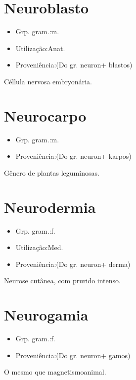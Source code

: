 \section{Neuroblasto}
\begin{itemize}
\item {Grp. gram.:m.}
\end{itemize}
\begin{itemize}
\item {Utilização:Anat.}
\end{itemize}
\begin{itemize}
\item {Proveniência:(Do gr. \textunderscore neuron\textunderscore  + \textunderscore blastos\textunderscore )}
\end{itemize}
Céllula nervosa embryonária.
\section{Neurocarpo}
\begin{itemize}
\item {Grp. gram.:m.}
\end{itemize}
\begin{itemize}
\item {Proveniência:(Do gr. \textunderscore neuron\textunderscore  + \textunderscore karpos\textunderscore )}
\end{itemize}
Gênero de plantas leguminosas.
\section{Neurodermia}
\begin{itemize}
\item {Grp. gram.:f.}
\end{itemize}
\begin{itemize}
\item {Utilização:Med.}
\end{itemize}
\begin{itemize}
\item {Proveniência:(Do gr. \textunderscore neuron\textunderscore  + \textunderscore derma\textunderscore )}
\end{itemize}
Neurose cutânea, com prurido intenso.
\section{Neurogamia}
\begin{itemize}
\item {Grp. gram.:f.}
\end{itemize}
\begin{itemize}
\item {Proveniência:(Do gr. \textunderscore neuron\textunderscore  + \textunderscore gamos\textunderscore )}
\end{itemize}
O mesmo que \textunderscore magnetismo\textunderscore  animal.
